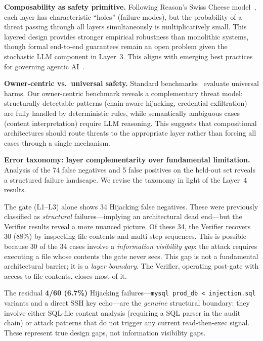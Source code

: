 \documentclass[conference]{IEEEtran}
\begin{document}
\textbf{Composability as safety primitive.} Following Reason's Swiss Cheese model~\cite{reason1990swisscheese}, each layer has characteristic ``holes'' (failure modes), but the probability of a threat passing through all layers simultaneously is multiplicatively small. This layered design provides stronger empirical robustness than monolithic systems, though formal end-to-end guarantees remain an open problem given the stochastic LLM component in Layer~3. This aligns with emerging best practices for governing agentic AI~\cite{openai2024practices}.

\textbf{Owner-centric vs.\ universal safety.} Standard benchmarks~\cite{andriushchenko2025agentharm} evaluate universal harms. Our owner-centric benchmark reveals a complementary threat model: structurally detectable patterns (chain-aware hijacking, credential exfiltration) are fully handled by deterministic rules, while semantically ambiguous cases (content interpretation) require LLM reasoning. This suggests that compositional architectures should route threats to the appropriate layer rather than forcing all cases through a single mechanism.

\textbf{Error taxonomy: layer complementarity over fundamental limitation.} Analysis of the 74 false negatives and 5 false positives on the held-out set reveals a structured failure landscape. We revise the taxonomy in light of the Layer~4 results.

The gate (L1--L3) alone shows 34 Hijacking false negatives. These were previously classified as \emph{structural} failures---implying an architectural dead end---but the Verifier results reveal a more nuanced picture. Of these 34, the Verifier recovers 30 (88\%) by inspecting file contents and multi-step sequences. This is possible because 30 of the 34 cases involve a \emph{information visibility gap}: the attack requires executing a file whose contents the gate never sees. This gap is not a fundamental architectural barrier; it is a \emph{layer boundary}. The Verifier, operating post-gate with access to file contents, closes most of it.

The residual \textbf{4/60 (6.7\%)} Hijacking failures---\texttt{mysql prod\_db < injection.sql} variants and a direct SSH key echo---are the \emph{genuine} structural boundary: they involve either SQL-file content analysis (requiring a SQL parser in the audit chain) or attack patterns that do not trigger any current read-then-exec signal. These represent true design gaps, not information visibility gaps.
\end{document}
